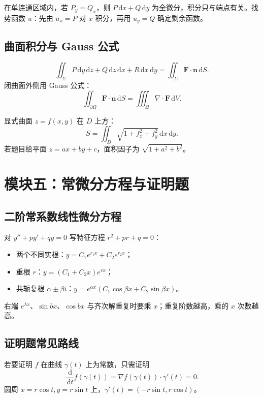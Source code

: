 \documentclass[UTF8,zihao=-4]{ctexart}
\newcommand{\dd}{\,\mathrm d}
\newcommand{\ve}[1]{\bm{#1}}
\newcommand{\grad}{\nabla}
\begin{document}
\begin{methodbox}[路径无关]
在单连通区域内，若 $P_y=Q_x$，则 $P\dd x+Q\dd y$ 为全微分，积分只与端点有关。找势函数 $u$：先由 $u_x=P$ 对 $x$ 积分，再用 $u_y=Q$ 确定剩余函数。
\end{methodbox}

\subsection{曲面积分与 Gauss 公式}
\begin{keybox}[通量积分]
\[
\iint_{\Sigma} P\dd y\dd z+Q\dd z\dd x+R\dd x\dd y=\iint_{\Sigma}\ve F\cdot\ve n\dd S.
\]
闭曲面外侧用 Gauss 公式：
\[
\iint_{\partial\Omega}\ve F\cdot\ve n\dd S=\iiint_{\Omega}\nabla\cdot\ve F\dd V.
\]
\end{keybox}

\begin{methodbox}[曲面面积]
显式曲面 $z=f(x,y)$ 在 $D$ 上方：
\[
S=\iint_D\sqrt{1+f_x^2+f_y^2}\dd x\dd y.
\]
若题目给平面 $z=ax+by+c$，面积因子为 $\sqrt{1+a^2+b^2}$。
\end{methodbox}

\section{模块五：常微分方程与证明题}

\subsection{二阶常系数线性微分方程}
\begin{methodbox}[齐次方程]
对 $y''+py'+qy=0$ 写特征方程 $r^2+pr+q=0$：
\begin{itemize}
  \item 两个不同实根：$y=C_1e^{r_1x}+C_2e^{r_2x}$；
  \item 重根 $r$：$y=(C_1+C_2x)e^{rx}$；
  \item 共轭复根 $\alpha\pm \beta i$：$y=e^{\alpha x}(C_1\cos\beta x+C_2\sin\beta x)$。
\end{itemize}
\end{methodbox}

\begin{warnbox}[非齐次特解易错]
右端 $e^{\lambda x}$、$\sin bx$、$\cos bx$ 与齐次解重复时要乘 $x$；重复阶数越高，乘的 $x$ 次数越高。
\end{warnbox}

\subsection{证明题常见路线}
\begin{methodbox}[沿曲线常数证明]
若要证明 $f$ 在曲线 $\gamma(t)$ 上为常数，只需证明
\[
\frac{\dd}{\dd t}f(\gamma(t))=\grad f(\gamma(t))\cdot\gamma'(t)=0.
\]
圆周 $x=r\cos t,y=r\sin t$ 上，$\gamma'(t)=(-r\sin t,r\cos t)$。
\end{methodbox}
\end{document}
